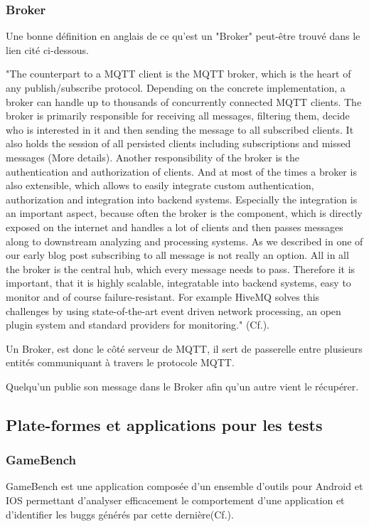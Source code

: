 \documentclass[12pt,a4paper]{article}
\begin{document}
\subsubsection*{Broker}
Une bonne définition en anglais de ce qu'est un "Broker" peut-être trouvé dans le lien cité ci-dessous. \par
"The counterpart to a MQTT client is the MQTT broker, which is the heart of any publish/subscribe protocol. Depending on the concrete implementation, a broker can handle up to thousands of concurrently connected MQTT clients. The broker is primarily responsible for receiving all messages, filtering them, decide who is interested in it and then sending the message to all subscribed clients. It also holds the session of all persisted clients including subscriptions and missed messages (More details). Another responsibility of the broker is the authentication and authorization of clients. And at most of the times a broker is also extensible, which allows to easily integrate custom authentication, authorization and integration into backend systems. Especially the integration is an important aspect, because often the broker is the component, which is directly exposed on the internet and handles a lot of clients and then passes messages along to downstream analyzing and processing systems. As we described in one of our early blog post subscribing to all message is not really an option. All in all the broker is the central hub, which every message needs to pass. Therefore it is important, that it is highly scalable, integratable into backend systems, easy to monitor and of course failure-resistant. For example HiveMQ solves this challenges by using state-of-the-art event driven network processing, an open plugin system and standard providers for monitoring." (Cf.\cite{Ref32}).\par
Un Broker, est donc le côté serveur de MQTT, il sert de passerelle entre plusieurs entités communiquant à travers le protocole MQTT.\par
Quelqu'un publie son message dans le Broker afin qu'un autre vient le récupérer.
\subsection{Plate-formes et applications pour les tests}
\subsubsection*{GameBench}
GameBench est une application composée d'un ensemble d'outils pour Android et IOS permettant d'analyser efficacement le comportement d'une application et d'identifier les buggs générés par cette dernière(Cf.\cite{Ref30}).
\end{document}
